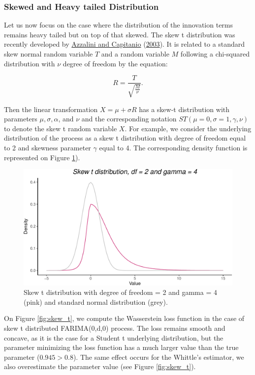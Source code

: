 \documentclass[
  11pt,
]{article}
\begin{document}
\hypertarget{skewed-and-heavy-tailed-distribution}{%
\subsubsection{Skewed and Heavy tailed
Distribution}\label{skewed-and-heavy-tailed-distribution}}

Let us now focus on the case where the distribution of the innovation
terms remains heavy tailed but on top of that skewed. The skew t
distribution was recently developed by
\protect\hyperlink{ref-azzalini2003distributions}{Azzalini and
Capitanio} (\protect\hyperlink{ref-azzalini2003distributions}{2003}). It
is related to a standard skew normal random variable \(T\) and a random
variable \(M\) following a chi-squared distribution with \(\nu\) degree
of freedom by the equation:

\[R=\frac{T}{\sqrt{\frac{M}{\nu}}}.\]

Then the linear transformation \(X=\mu+\sigma R\) has a skew-t
distribution with parameters \(\mu, \sigma, \alpha\), and \(\nu\) and
the corresponding notation \(S T(\mu = 0, \sigma = 1, \gamma, \nu)\) to
denote the skew t random variable \(X\). For example, we consider the
underlying distribution of the process as a skew t distribution with
degree of freedom equal to 2 and skewness parameter \(\gamma\) equal to
4. The corresponding density function is represented on Figure
\ref{fig:skewt_density}).

\begin{figure}

{\centering \includegraphics[width=0.5\linewidth]{Master_thesis_V3_files/figure-latex/skewt_density-1} 

}

\caption{Skew t distribution with degree of freedom = 2 and gamma = 4 (pink) and standard normal distribution (grey).}\label{fig:skewt_density}
\end{figure}

On Figure \ref{fig:skew_t}, we compute the Wasserstein loss function in
the case of skew t distributed FARIMA(0,d,0) process. The loss remains
smooth and concave, as it is the case for a Student t underlying
distribution, but the parameter minimizing the loss function has a much
larger value than the true parameter (\(0.945 > 0.8\)). The same effect
occurs for the Whittle's estimator, we also overestimate the parameter
value (see Figure \ref{fig:skew_t}).
\end{document}
